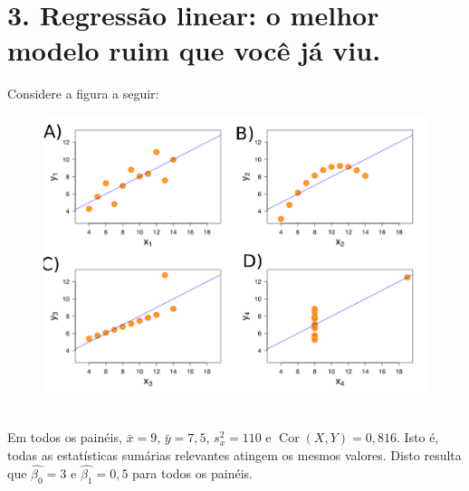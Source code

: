 \documentclass[a4paper,10pt, notitlepage]{report}
\begin{document}
\section*{3. Regressão linear: o melhor modelo ruim que você já viu.}

Considere a figura a seguir:
 \begin{figure}[!ht]
  \begin{center}
    \includegraphics[scale=.65]{../slides/figures/anscombe_mod.pdf}
  \end{center}
   \end{figure}
   \\
Em todos os painéis, $\bar{x} = 9$, $\bar{y} = 7,5$, $s_x^2 = 110$ e $\operatorname{Cor}(X, Y) = 0,816$.
Isto é, todas as estatísticas sumárias relevantes atingem os mesmos valores.
Disto resulta que $\hat{\beta_0} = 3$ e $\hat{\beta_1}=0,5$ para todos os painéis.
\end{document}
